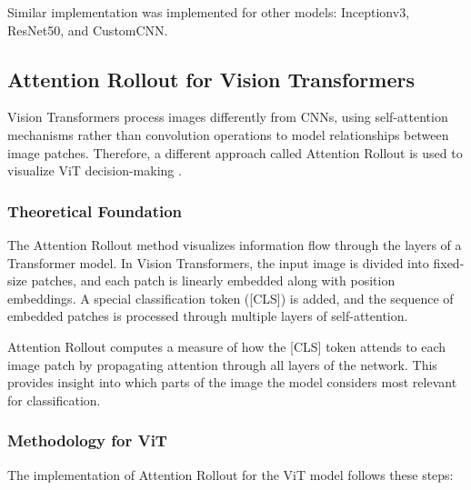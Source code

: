 \documentclass[a4paper,12pt]{report}
\begin{document}
Similar implementation was implemented for other models: Inceptionv3, ResNet50, and CustomCNN. 

\subsection{Attention Rollout for Vision Transformers}

Vision Transformers process images differently from CNNs, using self-attention mechanisms rather than convolution operations to model relationships between image patches. Therefore, a different approach called Attention Rollout is used to visualize ViT decision-making \citep{abnar2020attention}.

\subsubsection{Theoretical Foundation}

The Attention Rollout method visualizes information flow through the layers of a Transformer model. In Vision Transformers, the input image is divided into fixed-size patches, and each patch is linearly embedded along with position embeddings. A special classification token ([CLS]) is added, and the sequence of embedded patches is processed through multiple layers of self-attention.

Attention Rollout computes a measure of how the [CLS] token attends to each image patch by propagating attention through all layers of the network. This provides insight into which parts of the image the model considers most relevant for classification.

\subsubsection{Methodology for ViT}

The implementation of Attention Rollout for the ViT model follows these steps:
\end{document}
